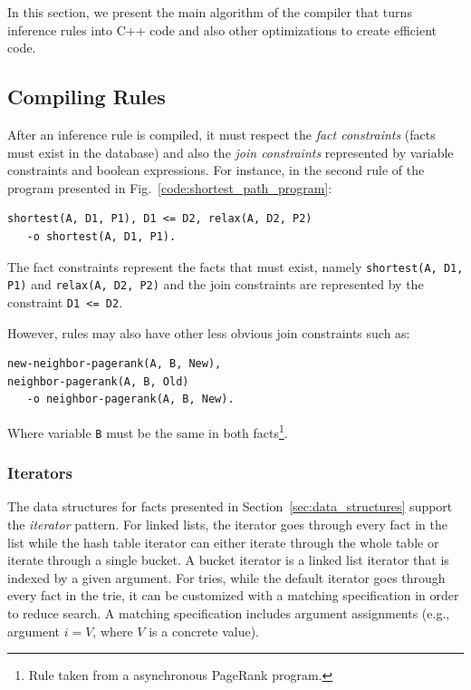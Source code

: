 
In this section, we present the main algorithm of the compiler that turns
inference rules into C++ code and also other optimizations to
create efficient code.

\subsection{Compiling Rules}\label{sec:compile}

After an inference rule is compiled, it must respect the \emph{fact constraints} (facts
must exist in the database) and also the \emph{join constraints} represented by
variable constraints and boolean expressions. For instance, in the second rule of the program presented
in Fig.~\ref{code:shortest_path_program}:

\begin{Verbatim}[fontsize=\scriptsize,label=example_rule]
shortest(A, D1, P1), D1 <= D2, relax(A, D2, P2)
   -o shortest(A, D1, P1).
\end{Verbatim}

The fact constraints represent the facts that must exist, namely
\texttt{shortest(A, D1, P1)} and \texttt{relax(A, D2, P2)} and the join
constraints are represented by the constraint \texttt{D1 <= D2}.

However, rules may also have other less obvious join constraints such as:

\begin{Verbatim}[fontsize=\scriptsize]
new-neighbor-pagerank(A, B, New),
neighbor-pagerank(A, B, Old)
   -o neighbor-pagerank(A, B, New).
\end{Verbatim}

Where variable \texttt{B} must be the same in both facts\footnote{Rule taken
from a asynchronous PageRank program.}.

\subsubsection{Iterators}

The data structures for facts presented in Section~\ref{sec:data_structures}
support the \emph{iterator} pattern. For linked lists, the iterator goes
through every fact in the list while the hash table iterator can either iterate
through the whole table or iterate through a single bucket. A bucket iterator is
a linked list iterator that is indexed by a given argument.
For tries, while the default iterator goes through every fact in
the trie, it can be customized with a matching specification in
order to reduce search. A matching specification includes argument
assignments (e.g., argument $i = V$, where $V$ is a concrete value).

